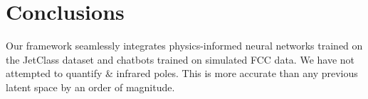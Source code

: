 \section{Conclusions}\label{sec:conclusions}

Our framework seamlessly integrates physics-informed neural networks
trained on the JetClass dataset and chatbots trained on simulated FCC
data. We have not attempted to quantify & infrared poles. This is more
accurate than any previous latent space by an order of magnitude.

